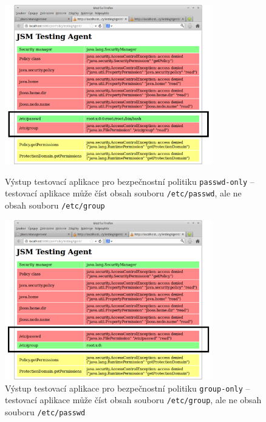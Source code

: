 \vspace{10 mm}
\begin{figure}[h]
  \centering
  \includegraphics[width=9cm]{fig/test-passwd}
  \caption{Výstup testovací aplikace pro bezpečnostní politiku {\tt passwd-only} -- testovací aplikace může číst obsah souboru {\tt /etc/passwd}, ale ne obsah souboru {\tt /etc/group}\newline}
  \label{testPasswd}
  \includegraphics[width=9cm]{fig/test-group}
  \caption{Výstup testovací aplikace pro bezpečnostní politiku {\tt group-only} -- testovací aplikace může číst obsah souboru {\tt /etc/group}, ale ne obsah souboru {\tt /etc/passwd}}
  \label{testGroup}
\end{figure}

